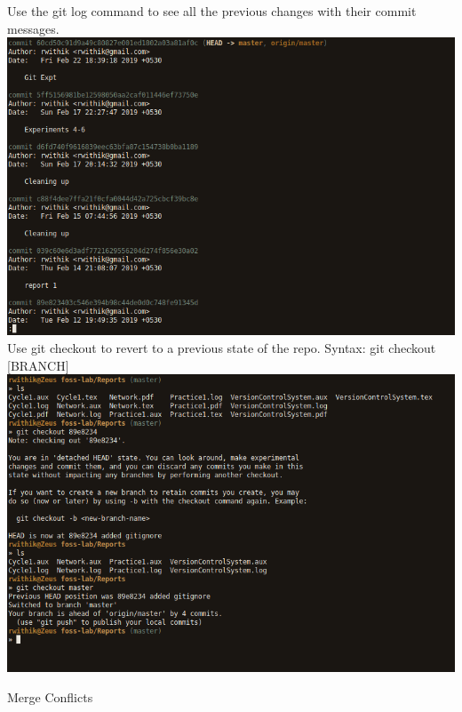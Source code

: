 \documentclass[10pt,a4paper,titlepage]{report}
\begin{document}
\vspace{.5cm}
\par Use the {\color{red} git log} command to see all the previous changes with their commit messages. \newline\newline
\includegraphics[scale=0.45]{../Images/VCS/6.png}\newline\newline
Use {\color{red} git checkout} to revert to a previous state of the repo. \newline
Syntax: git checkout [BRANCH]
\newline\newline
\includegraphics[scale=.45]{../Images/VCS/10.png}
\pagebreak
\begin{center}
\Large{Merge Conflicts}
\end{center}
\vspace{.5cm}
\end{document}
